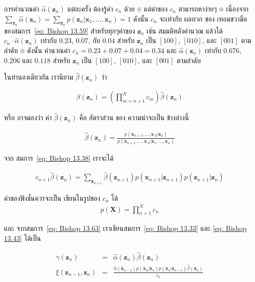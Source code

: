 การคำนวณค่า $\hat{\alpha}(\textbf{z}_n)$ แต่ละครั้ง ต้องรู้ค่า $c_n$ ด้วย 
๏ แต่ค่าของ $c_n$ สามารถหาง่ายๆ 
๏ เนื่องจาก $\sum_{\textbf{z}_n} \hat{\alpha}(\textbf{z}_n) = \sum_{\textbf{z}_n} p(\textbf{z}_n|\textbf{x}_1, \ldots, \textbf{x}_n) = 1$ 
ดังนั้น $c_n$ จะเท่ากับ ผลบวก ของ เทอมขวามือ ของสมการ~\ref{eq: Bishop 13.59} สำหรับทุกๆค่าของ $\textbf{z}_n$
เช่น สมมติหลังคำนวณ แล้วได้
$c_n \cdot \hat{\alpha}(\textbf{z}_n)$ เท่ากับ $0.23$, $0.07$, กับ $0.04$ สำหรับ $\textbf{z}_n$ เป็น $[100]$, $[010]$, และ $[001]$ ตามลำดับ
๏ ดังนั้น คำนวณค่า $c_n = 0.23 + 0.07 + 0.04 = 0.34$ และ $\hat{\alpha}(\textbf{z}_n)$ เท่ากับ $0.676$, $0.206$ และ $0.118$ สำหรับ $\textbf{z}_n$ เป็น $[100]$, $[010]$, และ $[001]$ ตามลำดับ

ในทำนองเดียวกัน เรานิยาม $\hat{\beta}(\textbf{z}_n)$ ว่า

\begin{eqnarray}
\beta (\textbf{z}_n) = \left( \prod_{m=n+1}^N c_m \right) \hat{\beta}(\textbf{z}_n)
\label{eq: Bishop 13.60}
\end{eqnarray}

หรือ อาจมองว่า ค่า $\hat{\beta}(\textbf{z}_n)$ คือ อัตราส่วน ของ ความน่าจะเป็น ข้างล่างนี้

\begin{eqnarray}
\hat{\beta} (\textbf{z}_n) = \frac{p(\textbf{x}_{n+1}, \ldots, \textbf{x}_N|\textbf{z}_n)}{p(\textbf{x}_{n+1}, \ldots, \textbf{x}_N|\textbf{x}_1, \ldots, \textbf{x}_n)}
\label{eq: Bishop 13.61}
\end{eqnarray}

จาก สมการ~\ref{eq: Bishop 13.38} เราจะได้

\begin{eqnarray}
c_{n+1} \hat{\beta}(\textbf{z}_n) = \sum_{\textbf{z}_{n+1}} \hat{\beta}(\textbf{z}_{n+1}) p (\textbf{x}_{n+1}|\textbf{z}_{n+1}) p(\textbf{z}_{n+1}|\textbf{z}_n)
\label{eq: Bishop 13.62}
\end{eqnarray}

ค่าของฟังชั่นควรจะเป็น เขียนในรูปของ $c_n$ ได้
\begin{eqnarray}
p(\textbf{X}) = \prod_{n=1}^N c_n
\label{eq: Bishop 13.63}
\end{eqnarray}

และ จากสมการ~\ref{eq: Bishop 13.63} เราเขียนสมการ~\ref{eq: Bishop 13.33} และ \ref{eq: Bishop 13.43} ได้เป็น

\begin{eqnarray}
\gamma(\textbf{z}_n) &=& \hat{\alpha}(\textbf{z}_n) \hat{\beta} (\textbf{z}_n)
\label{eq: Bishop 13.64} \\
\xi(\textbf{z}_{n-1},\textbf{z}_n) &=& \frac{\hat{\alpha} (\textbf{z}_{n-1}) p (\textbf{x}_n|\textbf{z}_n) p(\textbf{z}_n|\textbf{z}_{n-1}) \hat{\beta}(\textbf{z}_n)}{c_n}
\label{eq: Bishop 13.65}
\end{eqnarray}

